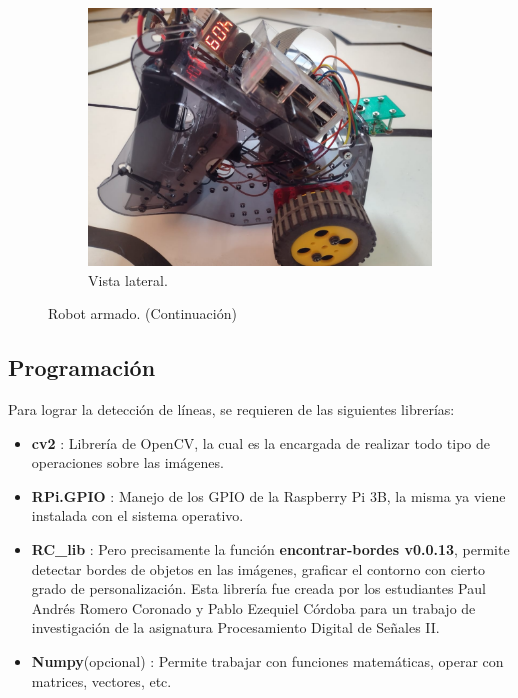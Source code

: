 \documentclass[11pt,a4paper]{article}
\begin{document}
	\begin{figure}[h!]
		\ContinuedFloat
		\centering
		\begin{subfigure}{0.5\textwidth}
			\includegraphics[width=\textwidth]{imagenes/robot_lateral.jpeg}
			\caption{Vista lateral.}
		\end{subfigure}
		\caption{Robot armado. (Continuación)}
		\label{fig:robot}
	\end{figure}	
	
	
	\pagebreak
	
	\subsection{Programación}
	Para lograr la detección de líneas, se requieren de las siguientes librerías:
	
	\begin{itemize}
		\item \textbf{cv2} \cite{opencv}: Librería de OpenCV, la cual es la encargada de realizar todo tipo de operaciones sobre las imágenes.
		\item \textbf{RPi.GPIO} \cite{raspi y gpio}: Manejo de los GPIO de la Raspberry Pi 3B, la misma ya viene instalada con el sistema operativo.
		\item \textbf{RC\_lib} \cite{encontrar_bordes}: Pero precisamente la función \textbf{encontrar-bordes v0.0.13}, permite detectar bordes de objetos en las imágenes, graficar el contorno con cierto grado de personalización. Esta librería fue creada por los estudiantes Paul Andrés Romero Coronado y Pablo Ezequiel Córdoba para un trabajo de investigación de la asignatura Procesamiento Digital de Señales II.
		\item \textbf{Numpy}(opcional) \cite{numpy}: Permite trabajar con funciones matemáticas, operar con matrices, vectores, etc.
	\end{itemize}
	
\end{document}
